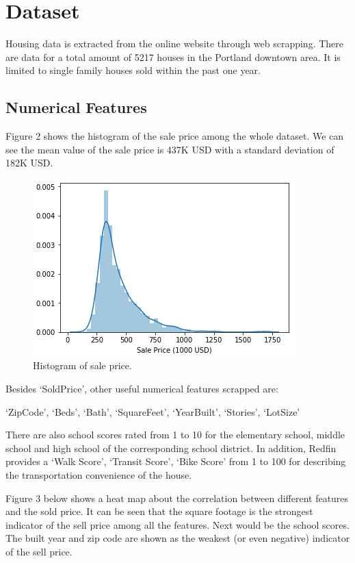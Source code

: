 \documentclass{article} %
\begin{document}
\section{Dataset}

Housing data is extracted from the online website through web scrapping.
There are data for a total amount of 5217 houses in the 
Portland downtown area.
It is limited to single family houses sold within the past one year.


\subsection{Numerical Features}

Figure 2 shows the histogram of the sale price among the whole dataset.
We can see the mean value of the sale price is 437K USD
with a standard deviation of 182K USD.

\begin{figure}[h]
	\begin{center}
		\includegraphics[width=0.5\linewidth]{fig/sale_price.png}
	\end{center}
	\caption{Histogram of sale price.}
	\label{fig:long}
	\label{fig:onecol}
\end{figure}

Besides `SoldPrice', other useful numerical features scrapped are:

`ZipCode', `Beds', `Bath', `SquareFeet', `YearBuilt', `Stories', `LotSize'

There are also school scores rated from 1 to 10 for the elementary school, middle school and high school
of the corresponding school district.
In addition, Redfin provides a `Walk Score', `Transit Score', `Bike Score' from 1 to 100
for describing the transportation convenience of the house.

Figure 3 below shows a heat map about the correlation between different features and the sold price.
It can be seen that the square footage is the strongest indicator of the sell price among all the features.
Next would be the school scores.
The built year and zip code are shown as the weakest (or even negative) indicator of the sell price.
\end{document}
